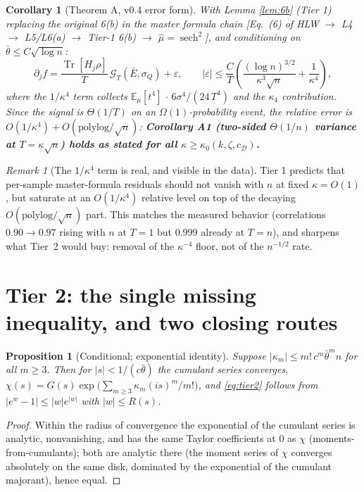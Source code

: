 \documentclass[11pt]{article}
\newtheorem{proposition}{Proposition}
\newtheorem{corollary}{Corollary}
\theoremstyle{remark}
\newtheorem{remark}{Remark}
\newcommand{\Tr}{\operatorname{Tr}}
\newcommand{\sech}{\operatorname{sech}}
\newcommand{\Ebar}{\bar{E}}
\newcommand{\sQ}{\sigma_Q}
\begin{document}
\begin{corollary}[Theorem A, v0.4 error form]\label{cor:thmA}
With Lemma \ref{lem:6b} (Tier 1) replacing the original 6(b) in the master
formula chain [Eq.~(6) of HLW $\to$ L4 $\to$ L5/L6(a) $\to$ Tier-1 6(b)
$\to$ $\widehat\mu=\sech^2$], and conditioning on
$\bar\theta\le C\sqrt{\log n}$:
\[
\partial_j f=\frac{\Tr[H_j\rho]}{T}\,
\mathcal G_T(\Ebar,\sQ)
+\varepsilon,\qquad
|\varepsilon|\le\frac{C}{T}\left(
\frac{(\log n)^{3/2}}{\kappa^3\sqrt n}+\frac{1}{\kappa^4}\right),
\]
where the $1/\kappa^4$ term collects
$\mathbb{E}_\mu[t^4]\,\cdot\,6\sigma^4/(24\,T^4)$ and the $\kappa_4$
contribution. Since the signal is $\Theta(1/T)$ on an $\Omega(1)$-probability
event, the relative error is $O(1/\kappa^4)+O(\mathrm{polylog}/\sqrt n)$:
\textbf{Corollary A1 (two-sided $\Theta(1/n)$ variance at $T=\kappa\sqrt n$)
holds as stated for all $\kappa\ge\kappa_0(k,\zeta,c_{\mathcal D})$.}
\end{corollary}

\begin{remark}[The $1/\kappa^4$ term is real, and visible in the data]
Tier 1 predicts that per-sample master-formula residuals should not vanish
with $n$ at fixed $\kappa=O(1)$, but saturate at an
$O(1/\kappa^4)$ relative level on top of the decaying
$O(\mathrm{polylog}/\sqrt n)$ part. This matches the measured behavior
(correlations $0.90\to0.97$ rising with $n$ at $T=1$ but $0.999$ already at
$T=n$), and sharpens what Tier~2 would buy: removal of the $\kappa^{-4}$
floor, not of the $n^{-1/2}$ rate.
\end{remark}

\section{Tier 2: the single missing inequality, and two closing routes}
\label{sec:tier2}

\begin{proposition}[Conditional; exponential identity]\label{prop:exp}
Suppose $|\kappa_m|\le m!\,c^m\bar\theta^m n$ for all $m\ge3$. Then for
$|s|<1/(c\bar\theta)$ the cumulant series converges,
$\chi(s)=G(s)\exp\big(\sum_{m\ge3}\kappa_m(is)^m/m!\big)$, and
\eqref{eq:tier2} follows from $|e^w-1|\le|w|e^{|w|}$ with
$|w|\le R(s)$.
\end{proposition}

\begin{proof}
Within the radius of convergence the exponential of the cumulant series is
analytic, nonvanishing, and has the same Taylor coefficients at $0$ as
$\chi$ (moments-from-cumulants); both are analytic there (the moment series
of $\chi$ converges absolutely on the same disk, dominated by the
exponential of the cumulant majorant), hence equal.
\end{proof}
\end{document}
